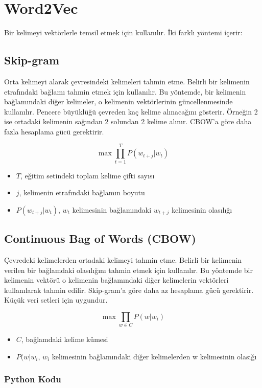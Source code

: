 \section{Word2Vec}
Bir kelimeyi vektörlerle temsil etmek için kullanılır. İki farklı yöntemi içerir:

\subsection{Skip-gram}
Orta kelimeyi alarak çevresindeki kelimeleri tahmin etme. Belirli bir kelimenin etrafındaki bağlamı tahmin etmek için kullanılır. Bu yöntemde, bir kelimenin bağlamındaki diğer kelimeler, o kelimenin vektörlerinin güncellenmesinde kullanılır. Pencere büyüklüğü çevreden kaç kelime alınacağını gösterir. Örneğin 2 ise ortadaki kelimenin sağından 2 solundan 2 kelime alınır. CBOW'a göre daha fazla hesaplama gücü gerektirir. 

\[\max \prod_{t=1}^{T} P(w_{t+j} | w_t)\]
\begin{itemize}
    \item $T$, eğitim setindeki toplam kelime çifti sayısı
    \item $j$, kelimenin etrafındaki bağlamın boyutu
    \item $P(w_{t+j} | w_{t})$, $w_{t}$ kelimesinin bağlamındaki $w_{t+j}$ kelimesinin olasılığı
\end{itemize}

\subsection{Continuous Bag of Words (CBOW)}
Çevredeki kelimelerden ortadaki kelimeyi tahmin etme. Belirli bir kelimenin verilen bir bağlamdaki olasılığını tahmin etmek için kullanılır. Bu yöntemde bir kelimenin vektörü o kelimenin bağlamındaki diğer kelimelerin vektörleri kullanılarak tahmin edilir. Skip-gram'a göre daha az hesaplama gücü gerektirir. Küçük veri setleri için uygundur.

\[\max \prod_{w \in C} P(w | w_i)\]
\begin{itemize}
    \item $C$, bağlamdaki kelime kümesi
    \item $P(w | w_{i}$, $w_{i}$ kelimesinin bağlamındaki diğer kelimelerden w kelimesinin olasığı
\end{itemize}

\subsubsection{Python Kodu}

